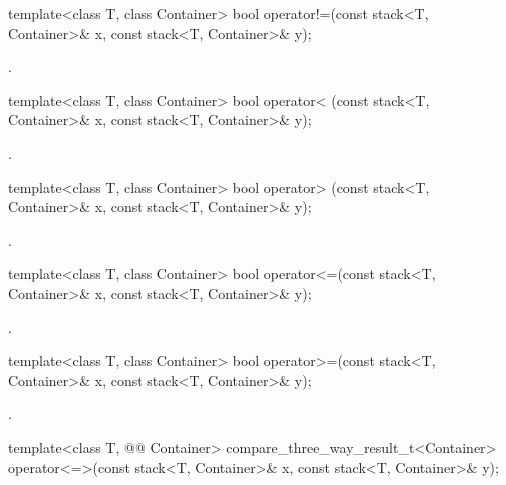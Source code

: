 %
\begin{itemdecl}
template<class T, class Container>
  bool operator!=(const stack<T, Container>& x, const stack<T, Container>& y);
\end{itemdecl}

\begin{itemdescr}
\pnum
\returns
{}.
\end{itemdescr}

%
\begin{itemdecl}
template<class T, class Container>
  bool operator< (const stack<T, Container>& x, const stack<T, Container>& y);
\end{itemdecl}

\begin{itemdescr}
\pnum
\returns
{}.
\end{itemdescr}

%
\begin{itemdecl}
template<class T, class Container>
  bool operator> (const stack<T, Container>& x, const stack<T, Container>& y);
\end{itemdecl}

\begin{itemdescr}
\pnum
\returns
{}.
\end{itemdescr}

%
\begin{itemdecl}
template<class T, class Container>
  bool operator<=(const stack<T, Container>& x, const stack<T, Container>& y);
\end{itemdecl}

\begin{itemdescr}
\pnum
\returns
{}.
\end{itemdescr}

%
\begin{itemdecl}
template<class T, class Container>
    bool operator>=(const stack<T, Container>& x, const stack<T, Container>& y);
\end{itemdecl}

\begin{itemdescr}
\pnum
\returns
{}.
\end{itemdescr}

%
\begin{itemdecl}
template<class T, @@ Container>
  compare_three_way_result_t<Container>
    operator<=>(const stack<T, Container>& x, const stack<T, Container>& y);
\end{itemdecl}

